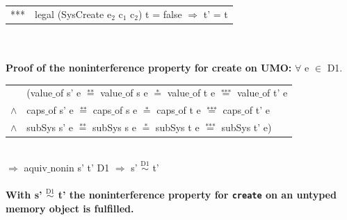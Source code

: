 \documentclass[11pt,a4paper,twoside]{article}
\begin{document}
{\begin{tabular}{ll}
*** & legal (SysCreate e$_2$ c$_1$ c$_2$) t = false $\Rightarrow$ t' = t
\end{tabular}\\ \\ 
\textbf{Proof of the noninterference property for create on UMO:}
$\forall$ e $\in$ D1. \\ 
\begin{tabular}{ll}
& (value$\_$of s' e $\overset{\text{**}}{=}$ value$\_$of s e $\overset{\text{*}}{=}$ value$\_$of t e $\overset{\text{***}}{=}$ value$\_$of t' e \\
$\wedge$ & caps$\_$of s' e $\overset{\text{**}}{=}$ caps$\_$of s e $\overset{\text{*}}{=}$ caps$\_$of t e $\overset{\text{***}}{=}$ caps$\_$of t' e \\
$\wedge$ & subSys s' e $\overset{\text{**}}{=}$ subSys s e $\overset{\text{*}}{=}$ subSys t e $\overset{\text{***}}{=}$ subSys t' e)
\end{tabular} \\
$\Rightarrow$ aquiv$\_$nonin s' t' D1 $\Rightarrow$ s' $\overset{\text{D1}}{\sim}$ t' \\ \\
\textbf{With s' $\overset{\text{D1}}{\sim}$ t' the noninterference property for \texttt{create} on an untyped memory object is fulfilled.} 
}
\end{document}
